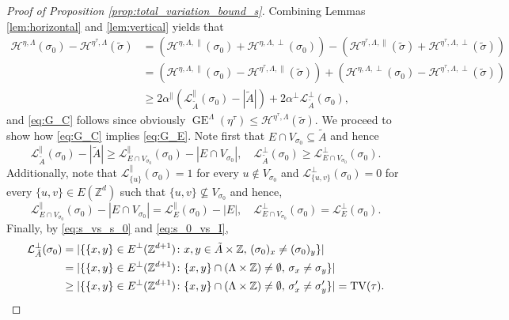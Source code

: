 \documentclass[11pt, reqno]{amsart}
\newcommand{\Z}{\mathbb{Z}}
\DeclareMathOperator{\GE}{GE}
\DeclareMathOperator{\TV}{TV}
\numberwithin{equation}{section}
\begin{document}
\begin{proof}[Proof of Proposition \ref{prop:total_variation_bound_s}]
Combining Lemmas \ref{lem:horizontal} and \ref{lem:vertical} yields that
\begin{align*}
\mathcal{H}^{\eta,\Lambda}(\sigma_0)-
\mathcal{H}^{\eta^{\tau},\Lambda}(\tilde{\sigma})
&=\left(\mathcal{H}^{\eta,\Lambda,\parallel}(\sigma_0)+\mathcal{H}^{\eta,\Lambda,\perp}(\sigma_0)\right)-
\left(\mathcal{H}^{\eta^{\tau},\Lambda,\parallel}(\tilde{\sigma})+\mathcal{H}^{\eta^{\tau},\Lambda,\perp}(\tilde{\sigma})\right)\\
&=\left(\mathcal{H}^{\eta,\Lambda,\parallel}(\sigma_0)-\mathcal{H}^{\eta^{\tau},\Lambda,\parallel}(\tilde{\sigma})\right)+\left(\mathcal{H}^{\eta,\Lambda,\perp}(\sigma_0)-\mathcal{H}^{\eta^{\tau},\Lambda,\perp}(\tilde{\sigma})\right)\\
&\geq 2\alpha^{\parallel} \left( \mathcal{L}^{\parallel}_{\tilde{A}}(\sigma_0)-|\tilde{A}|\right)+2\alpha^{\perp}\mathcal{L}^{\perp}_{\tilde{A}}(\sigma_0),
\end{align*}
and \eqref{eq:G_C} follows since obviously $\GE^{\Lambda}(\eta^{\tau})\leq \mathcal{H}^{\eta^{\tau},\Lambda}(\tilde{\sigma})$.
We proceed to show how \eqref{eq:G_C} implies \eqref{eq:G_E}. 
Note first that
$E\cap V_{\sigma_0}\subseteq\tilde{A}$ and hence
$$
\mathcal{L}^{\parallel}_{\tilde{A}}(\sigma_0)-|\tilde{A}|\geq \mathcal{L}^{\parallel}_{E\cap V_{\sigma_0}}(\sigma_0)-|E\cap V_{\sigma_0}|,\quad \mathcal{L}^{\perp}_{\tilde{A}}(\sigma_0)\geq \mathcal{L}^{\perp}_{E\cap V_{\sigma_0}}(\sigma_0).
$$
Additionally, note that $\mathcal{L}^{\parallel}_{\{u\}}(\sigma_0)=1$ for every $u\notin V_{\sigma_0}$ and $\mathcal{L}^{\perp}_{\{u,v\}}(\sigma_0)=0$ for every $\{u,v\}\in E(\Z^d)$ such that $\{u,v\}\nsubseteq V_{\sigma_0}$ and hence,
\begin{equation*}
\mathcal{L}^{\parallel}_{E\cap V_{\sigma_0}}(\sigma_0)-|E\cap V_{\sigma_0}|=\mathcal{L}^{\parallel}_E(\sigma_0)-|E|,\quad \mathcal{L}^{\perp}_{E\cap V_{\sigma_0}}(\sigma_0)=\mathcal{L}^{\perp}_E(\sigma_0).
\end{equation*}
Finally, by \eqref{eq:s_vs_s_0} and \eqref{eq:s_0_vs_I},
\begin{align*}
\mathcal{L}^{\perp}_{\tilde{A}}(\sigma_0)&=\lvert\{\{x,y\}\in E^{\perp}({\mathbb Z}^{d+1})\colon x,y\in\tilde{A}\times{\mathbb Z},\,(\sigma_0)_x\neq(\sigma_0)_y\}\rvert\\
&=\lvert\{\{x,y\}\in E^{\perp}({\mathbb Z}^{d+1})\colon \{x,y\}\cap(\Lambda\times{\mathbb Z})\neq\emptyset,\,\sigma_x\neq\sigma_y\}\rvert\\
&\geq \lvert\{\{x,y\}\in E^{\perp}({\mathbb Z}^{d+1})\colon \{x,y\}\cap(\Lambda\times{\mathbb Z})\neq\emptyset,\,\sigma'_x\neq\sigma'_y\}\rvert=\TV({\tau}).
\qedhere\end{align*}
\end{proof} 
\end{document}
